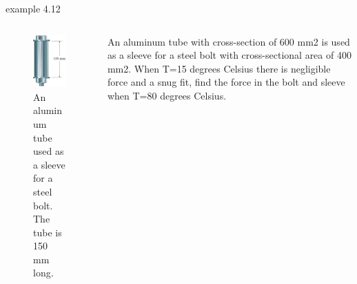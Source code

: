 \documentclass[
  letterpaper,
  ignorenonframetext,
  aspectratio=43,
  handout,
  12pt]{beamer}
\let\Oldincludegraphics\includegraphics
\renewcommand{\includegraphics}[2][]{\Oldincludegraphics[width=\textwidth,height=0.7\textheight,keepaspectratio]{#2}}
\begin{document}
\begin{frame}{example 4.12}
\protect\hypertarget{example-4.12}{}
\begin{columns}[T]
\begin{column}{0.5\textwidth}
\begin{figure}
\centering
\includegraphics{../images/example-4-12.jpg}
\caption{An aluminum tube used as a sleeve for a steel bolt. The tube is
150 mm long.}
\end{figure}
\end{column}

\begin{column}{0.5\textwidth}
An aluminum tube with cross-section of 600 mm2 is used as a sleeve for a
steel bolt with cross-sectional area of 400 mm2. When T=15 degrees
Celsius there is negligible force and a snug fit, find the force in the
bolt and sleeve when T=80 degrees Celsius.
\end{column}
\end{columns}
\end{frame}
\end{document}
